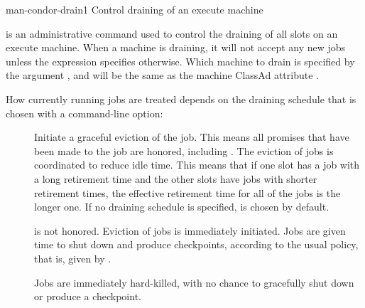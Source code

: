 \begin{ManPage}{}{man-condor-drain}{1}
{Control draining of an execute machine}

\Synopsis {}

\ToolDebugOption
{}

\ToolDebugOption
{}

\Description

 is an administrative command used to control the draining
of all slots on an execute machine.  
When a machine is draining, it will not accept any new jobs
unless the  expression specifies otherwise.
Which machine to drain is specified by the argument ,
and will be the same as the machine ClassAd attribute . 

How currently running jobs are treated 
depends on the draining schedule that is chosen with a command-line option:

\begin{description}

\item[] Initiate a graceful eviction of the job.  
This means all promises that have been made to the job are honored, 
including .  
The eviction of jobs is coordinated to reduce idle time.  
This means that if one slot has a job with a long
retirement time and the other slots have jobs with shorter retirement times, 
the effective retirement time for all of the jobs is the longer one.
If no draining schedule is specified, 
 is chosen by default.

\item[]  is not honored.  
Eviction of jobs is immediately initiated.  
Jobs are given time to shut down and produce checkpoints,
 according to the usual policy, that is, 
given by .

\item[] Jobs are immediately hard-killed,
with no chance to gracefully shut down or produce a checkpoint.


\end{description}
\end{ManPage}
